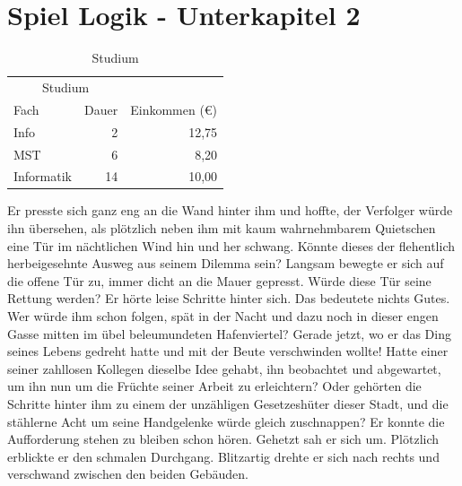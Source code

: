 \section{Spiel Logik - Unterkapitel 2}
\label{Spiel_Logik_-_Unterkapitel_2}
%
\begin{table}[b]
\centering
\begin{tabular}{lrr}
\toprule
\multicolumn{2}{c}{Studium}\\ \cmidrule{1-2}
Fach & Dauer & Einkommen (\euro{})\\
\midrule
Info & 2 & 12,75 \\ \addlinespace
MST & 6 & 8,20 \\ \addlinespace
Informatik & 14 & 10,00\\
\bottomrule
\end{tabular}
\caption{Studium}
\label{table:Studium}
\end{table}
%
Er presste sich ganz eng an die Wand hinter ihm und hoffte, der
Verfolger würde ihn übersehen, als plötzlich neben ihm mit kaum
wahrnehmbarem Quietschen eine Tür im nächtlichen Wind hin und her
schwang. Könnte dieses der flehentlich herbeigesehnte Ausweg aus
seinem Dilemma sein? Langsam bewegte er sich auf die offene Tür
zu, immer dicht an die Mauer gepresst. Würde diese Tür seine
Rettung werden? Er hörte leise Schritte hinter sich. Das bedeutete
nichts Gutes. Wer würde ihm schon folgen, spät in der Nacht und
dazu noch in dieser engen Gasse mitten im übel beleumundeten
Hafenviertel? Gerade jetzt, wo er das Ding seines Lebens gedreht
hatte und mit der Beute verschwinden wollte! Hatte einer seiner
zahllosen Kollegen dieselbe Idee gehabt, ihn beobachtet und
abgewartet, um ihn nun um die Früchte seiner Arbeit zu
erleichtern? Oder gehörten die Schritte hinter ihm zu einem der
unzähligen Gesetzeshüter dieser Stadt, und die stählerne Acht um
seine Handgelenke würde gleich zuschnappen? Er konnte die
Aufforderung stehen zu bleiben schon hören. Gehetzt sah er sich
um. Plötzlich erblickte er den schmalen Durchgang. Blitzartig
drehte er sich nach rechts und verschwand zwischen den beiden
Gebäuden.

